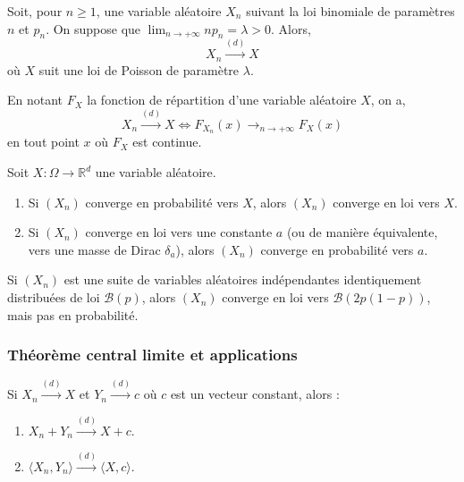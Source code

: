  \begin{application}
    Soit, pour $n \geq 1$, une variable aléatoire $X_n$ suivant la loi binomiale de paramètres $n$ et $p_n$. On suppose que $\lim_{n \rightarrow +\infty} n p_n = \lambda > 0$.
    Alors,
    \[ X_n \overset{(d)}{\longrightarrow} X \]
    où $X$ suit une loi de Poisson de paramètre $\lambda$.
  \end{application}


  \begin{theorem}
    En notant $F_X$ la fonction de répartition d'une variable aléatoire $X$, on a,
    \[ X_n \overset{(d)}{\longrightarrow} X \iff F_{X_n}(x) \longrightarrow_{n \rightarrow +\infty} F_X(x) \]
    en tout point $x$ où $F_X$ est continue.
  \end{theorem}

  \begin{theorem}
    Soit $X : \Omega \rightarrow \mathbb{R}^d$ une variable aléatoire.
    \begin{enumerate}[label=(\roman*)]
      \item Si $(X_n)$ converge en probabilité vers $X$, alors $(X_n)$ converge en loi vers $X$.
      \item Si $(X_n)$ converge en loi vers une constante $a$ (ou de manière équivalente, vers une masse de Dirac $\delta_a$), alors $(X_n)$ converge en probabilité vers $a$.
    \end{enumerate}
  \end{theorem}


  \begin{cexample}
    Si $(X_n)$ est une suite de variables aléatoires indépendantes identiquement distribuées de loi $\mathcal{B}(p)$, alors $(X_n)$ converge en loi vers $\mathcal{B}(2p(1-p))$, mais pas en probabilité.
  \end{cexample}

  \subsubsection{Théorème central limite et applications}


  \begin{theorem}[Slutsky]
    Si $X_n \overset{(d)}{\longrightarrow} X$ et $Y_n \overset{(d)}{\longrightarrow} c$ où $c$ est un vecteur constant, alors :
    \begin{enumerate}[label=(\roman*)]
      \item $X_n + Y_n \overset{(d)}{\longrightarrow} X + c$.
      \item $\langle X_n, Y_n \rangle \overset{(d)}{\longrightarrow} \langle X, c \rangle$.
    \end{enumerate}
  \end{theorem}

